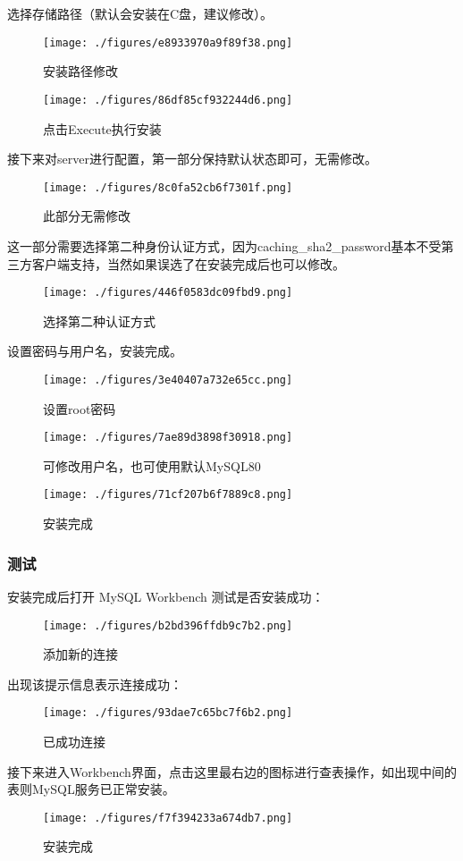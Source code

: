 选择存储路径（默认会安装在C盘，建议修改）。
\begin{figure}[ht]
\centering
\texttt{[image: ./figures/e8933970a9f89f38.png]}
\caption{安装路径修改} \label{fig_MSQ001_10}
\end{figure}

\begin{figure}[ht]
\centering
\texttt{[image: ./figures/86df85cf932244d6.png]}
\caption{点击Execute执行安装} \label{fig_MSQ001_11}
\end{figure}

接下来对server进行配置，第一部分保持默认状态即可，无需修改。
\begin{figure}[ht]
\centering
\texttt{[image: ./figures/8c0fa52cb6f7301f.png]}
\caption{此部分无需修改} \label{fig_MSQ001_12}
\end{figure}

这一部分需要选择第二种身份认证方式，因为caching\_sha2\_password基本不受第三方客户端支持，当然如果误选了在安装完成后也可以修改。

\begin{figure}[ht]
\centering
\texttt{[image: ./figures/446f0583dc09fbd9.png]}
\caption{选择第二种认证方式} \label{fig_MSQ001_13}
\end{figure}

设置密码与用户名，安装完成。
\begin{figure}[ht]
\centering
\texttt{[image: ./figures/3e40407a732e65cc.png]}
\caption{设置root密码} \label{fig_MSQ001_14}
\end{figure}

\begin{figure}[ht]
\centering
\texttt{[image: ./figures/7ae89d3898f30918.png]}
\caption{可修改用户名，也可使用默认MySQL80} \label{fig_MSQ001_15}
\end{figure}

\begin{figure}[ht]
\centering
\texttt{[image: ./figures/71cf207b6f7889c8.png]}
\caption{安装完成} \label{fig_MSQ001_16}
\end{figure}

\subsubsection{测试}
安装完成后打开 MySQL Workbench 测试是否安装成功：
\begin{figure}[ht]
\centering
\texttt{[image: ./figures/b2bd396ffdb9c7b2.png]}
\caption{添加新的连接} \label{fig_MSQ001_17}
\end{figure}

出现该提示信息表示连接成功：
\begin{figure}[ht]
\centering
\texttt{[image: ./figures/93dae7c65bc7f6b2.png]}
\caption{已成功连接} \label{fig_MSQ001_18}
\end{figure}

接下来进入Workbench界面，点击这里最右边的图标进行查表操作，如出现中间的表则MySQL服务已正常安装。
\begin{figure}[ht]
\centering
\texttt{[image: ./figures/f7f394233a674db7.png]}
\caption{安装完成} \label{fig_MSQ001_19}
\end{figure}